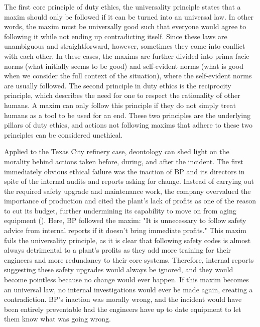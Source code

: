 \documentclass[12pt]{article}
\begin{document}
	The first core principle of duty ethics, the universality principle states that a maxim should only be followed if it can be turned into an universal law. In other words, the maxim must be universally good such that everyone would agree to following it while not ending up contradicting itself. Since these laws are unambiguous and straightforward, however, sometimes they come into conflict with each other. In these cases, the maxims are further divided into prima facie norms (what initially seems to be good) and self-evident norms (what is good when we consider the full context of the situation), where the self-evident norms are usually followed. The second principle in duty ethics is the reciprocity principle, which describes the need for one to respect the rationality of other humans. A maxim can only follow this principle if they do not simply treat humans as a tool to be used for an end. These two principles are the underlying pillars of duty ethics, and actions not following maxims that adhere to these two principles can be considered unethical.
	
	Applied to the Texas City refinery case, deontology can shed light on the morality behind actions taken before, during, and after the incident. The first immediately obvious ethical failure was the inaction of BP and its directors in spite of the internal audits and reports asking for change. Instead of carrying out the required safety upgrade and maintenance work, the company overvalued the importance of production and cited the plant's lack of profits as one of the reason to cut its budget, further undermining its capability to move on from aging equipment (\cite{csbreport}). Here, BP followed the maxim: "It is unnecessary to follow safety advice from internal reports if it doesn't bring immediate profits." This maxim fails the universality principle, as it is clear that following safety codes is almost always detrimental to a plant's profits as they add more training for their engineers and more redundancy to their core systems. Therefore, internal reports suggesting these safety upgrades would always be ignored, and they would become pointless because no change would ever happen. If this maxim becomes an universal law, no internal investigations would ever be made again, creating a contradiction. BP's inaction was morally wrong, and the incident would have been entirely preventable had the engineers have up to date equipment to let them know what was going wrong.
	
\end{document}

